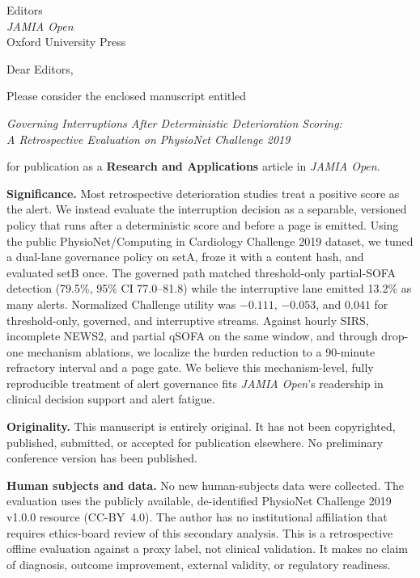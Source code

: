 \documentclass[10pt]{letter}
\date{\today}
\renewcommand*{\opening}[1]{\vspace*{-1.2em}{\raggedright \toname \\ \toaddress
  \vspace{1.2em}\par}%
  \noindent #1\par\vspace{0.6em}}
\begin{document}
\begin{letter}{Editors\\
\textit{JAMIA Open}\\
Oxford University Press}

\opening{Dear Editors,}

Please consider the enclosed manuscript entitled

\begin{center}\itshape
Governing Interruptions After Deterministic Deterioration Scoring:\\
A Retrospective Evaluation on PhysioNet Challenge 2019
\end{center}

for publication as a \textbf{Research and Applications} article in \textit{JAMIA Open}.

\textbf{Significance.}
Most retrospective deterioration studies treat a positive score as the alert.
We instead evaluate the interruption decision as a separable, versioned policy
that runs after a deterministic score and before a page is emitted. Using the
public PhysioNet/Computing in Cardiology Challenge 2019 dataset, we tuned a
dual-lane governance policy on setA, froze it with a content hash, and
evaluated setB once. The governed path matched threshold-only partial-SOFA
detection (79.5\%, 95\% CI 77.0--81.8) while the interruptive lane emitted
13.2\% as many alerts. Normalized Challenge utility was $-0.111$, $-0.053$,
and $0.041$ for threshold-only, governed, and interruptive streams. Against
hourly SIRS, incomplete NEWS2, and partial qSOFA on the same window, and
through drop-one mechanism ablations, we
localize the burden reduction to a 90-minute refractory interval and a page
gate. We believe this mechanism-level, fully reproducible treatment of alert
governance fits \textit{JAMIA Open}'s readership in clinical decision support
and alert fatigue.

\textbf{Originality.}
This manuscript is entirely original. It has not been copyrighted, published,
submitted, or accepted for publication elsewhere. No preliminary conference
version has been published.

\textbf{Human subjects and data.}
No new human-subjects data were collected. The evaluation uses the publicly
available, de-identified PhysioNet Challenge 2019 v1.0.0 resource (CC-BY~4.0).
The author has no institutional affiliation that requires ethics-board review of
this secondary analysis. This is a retrospective offline evaluation against a
proxy label, not clinical validation. It makes no claim of diagnosis, outcome
improvement, external validity, or regulatory readiness.


\end{letter}
\end{document}
